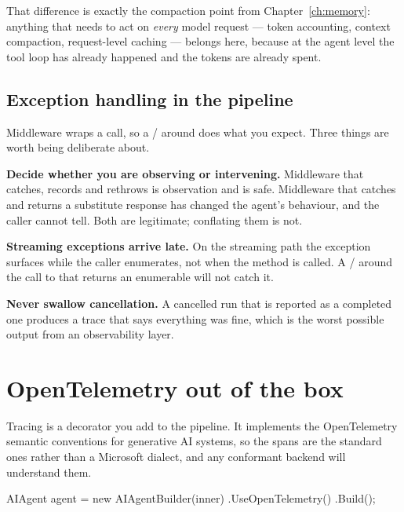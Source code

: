 That difference is exactly the compaction point from Chapter~\ref{ch:memory}:
anything that needs to act on \emph{every} model request --- token accounting,
context compaction, request-level caching --- belongs here, because at the agent
level the tool loop has already happened and the tokens are already spent.

\subsection{Exception handling in the pipeline}

Middleware wraps a call, so a / around  does what
you expect. Three things are worth being deliberate about.

\textbf{Decide whether you are observing or intervening.} Middleware that catches,
records and rethrows is observation and is safe. Middleware that catches and
returns a substitute response has changed the agent's behaviour, and the caller
cannot tell. Both are legitimate; conflating them is not.

\textbf{Streaming exceptions arrive late.} On the streaming path the exception
surfaces while the caller enumerates, not when the method is called. A
/ around the call to  that returns an enumerable
will not catch it.

\textbf{Never swallow cancellation.} A cancelled run that is reported as a
completed one produces a trace that says everything was fine, which is the worst
possible output from an observability layer.

\section{OpenTelemetry out of the box}
\label{sec:obs-otel}

Tracing is a decorator you add to the pipeline. It implements the OpenTelemetry
semantic conventions for generative AI systems, so the spans are the standard
ones rather than a Microsoft dialect, and any conformant backend will understand
them.

\begin{csharp}[caption={Turning on tracing}, label={lst:obs-otel-agent}]
AIAgent agent = new AIAgentBuilder(inner)
    .UseOpenTelemetry()
    .Build();
\end{csharp}

